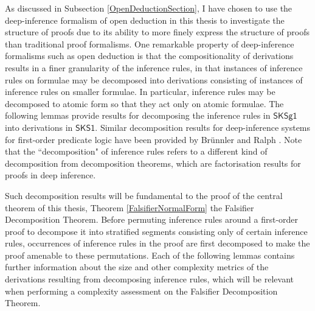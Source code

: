 \documentclass[10pt]{article}
\theoremstyle{definition}\newtheorem{remark}[theorem]{Remark}
\theoremstyle{definition}\newtheorem{example}[theorem]{Example}
\theoremstyle{definition}\newtheorem{definition}[theorem]{Definition}
\newcommand{\SKSq}{{\mathsf{SKSg1}}}
\newcommand{\SKSqDecomp}{{\mathsf{SKS1}}}
\begin{document}
	As discussed in Subsection \ref{OpenDeductionSection}, I have chosen to use the deep-inference formalism of open deduction in this thesis to investigate the structure of proofs due to its ability to more finely express the structure of proofs than traditional proof formalisms. One remarkable property of deep-inference formalisms such as open deduction is that the compositionality of derivations results in a finer granularity of the inference rules, in that instances of inference rules on formulae may be decomposed into derivations consisting of instances of inference rules on smaller formulae. In particular, inference rules may be decomposed to atomic form so that they act only on atomic formulae. The following lemmas provide results for decomposing the inference rules in $\SKSq$ into derivations in $\SKSqDecomp$. Similar decomposition results for deep-inference systems for first-order predicate logic have been provided by Brünnler and Ralph \cite{BenThesis, KaiCutElimination}. Note that the ``decomposition" of inference rules refers to a different kind of decomposition from decomposition theorems, which are factorisation results for proofs in deep inference.
	
	Such decomposition results will be fundamental to the proof of the central theorem of this thesis, Theorem \ref{FalsifierNormalForm} the Falsifier Decomposition Theorem. Before permuting inference rules around a first-order proof to decompose it into stratified segments consisting only of certain inference rules, occurrences of inference rules in the proof are first decomposed to make the proof amenable to these permutations. Each of the following lemmas contains further information about the size and other complexity metrics of the derivations resulting from decomposing inference rules, which will be relevant when performing a complexity assessment on the Falsifier Decomposition Theorem.
	
\end{document}

